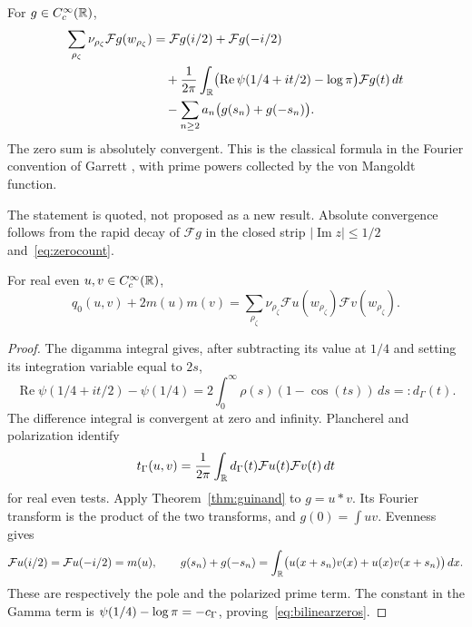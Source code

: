 \begin{theorem}\label{thm:guinand}
For $g\in C_c^\infty(\mathbb R)$,
\begin{align}\label{eq:guinand}
 \sum_{\rho_\zeta}\nu_{\rho_\zeta}\mathcal Fg(w_{\rho_\zeta})
 &=\mathcal Fg(i/2)+\mathcal Fg(-i/2)\notag\\
 &\quad+\frac1{2\pi}\int_\mathbb R
   \bigl(\operatorname{Re}\psi(1/4+it/2)-\log\pi\bigr)
       \mathcal Fg(t)\,dt\notag\\
 &\quad-\sum_{n\ge2}a_n\bigl(g(s_n)+g(-s_n)\bigr).
\end{align}
The zero sum is absolutely convergent. This is the classical formula in the Fourier convention of Garrett \cite[Theorem~0.1]{Garrett}, with prime powers collected by the von Mangoldt function.
\end{theorem}

The statement is quoted, not proposed as a new result. Absolute convergence follows from the rapid decay of $\mathcal Fg$ in the closed strip $|\operatorname{Im}z|\le1/2$ and~\eqref{eq:zerocount}.

\begin{lemma}\label{lem:bilinear}
For real even $u,v\in C_c^\infty(\mathbb R)$,
\begin{equation}\label{eq:bilinearzeros}
 q_0(u,v)+2m(u)m(v)
   =\sum_{\rho_\zeta}\nu_{\rho_\zeta}
       \mathcal Fu(w_{\rho_\zeta})\mathcal Fv(w_{\rho_\zeta}).
\end{equation}
\end{lemma}
\begin{proof}
The digamma integral \cite[Eq.~5.9.16]{DLMF} gives, after subtracting its value at $1/4$ and setting its integration variable equal to $2s$,
\begin{equation}\label{eq:digammamultiplier}
 \operatorname{Re}\psi(1/4+it/2)-\psi(1/4)
    =2\int_0^\infty\rho(s)(1-\cos(ts))\,ds=:d_\Gamma(t).
\end{equation}
The difference integral is convergent at zero and infinity. Plancherel and polarization identify
\[
 t_\Gamma(u,v)=\frac1{2\pi}\int_\mathbb R
       d_\Gamma(t)\mathcal Fu(t)\mathcal Fv(t)\,dt
\]
for real even tests. Apply Theorem~\ref{thm:guinand} to $g=u*v$. Its Fourier transform is the product of the two transforms, and $g(0)=\int uv$. Evenness gives
\[
 \mathcal Fu(i/2)=\mathcal Fu(-i/2)=m(u),\qquad
 g(s_n)+g(-s_n)
  =\int_\mathbb R\bigl(u(x+s_n)v(x)+u(x)v(x+s_n)\bigr)\,dx.
\]
These are respectively the pole and the polarized prime term. The constant in the Gamma term is $\psi(1/4)-\log\pi=-c_\Gamma$, proving~\eqref{eq:bilinearzeros}.
\end{proof}

